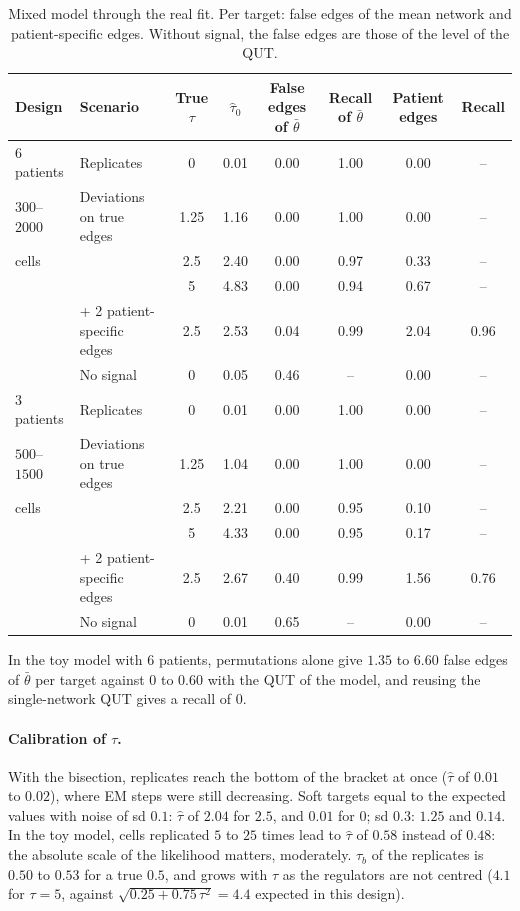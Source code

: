 \documentclass[a4paper, 11pt]{article}
\newcommand{\tb}{\bar\theta}
\theoremstyle{plain}
\theoremstyle{remark}
\begin{document}
\begin{table}[h]
\centering\small
\begin{tabular}{llcccccc}
\toprule
Design & Scenario & True $\tau$ & $\hat\tau_0$ & False edges of $\tb$ & Recall of $\tb$ & Patient edges & Recall \\
\midrule
$6$ patients & Replicates & 0 & 0.01 & 0.00 & 1.00 & 0.00 & -- \\
$300$--$2000$ & Deviations on true edges & 1.25 & 1.16 & 0.00 & 1.00 & 0.00 & -- \\
cells & & 2.5 & 2.40 & 0.00 & 0.97 & 0.33 & -- \\
 & & 5 & 4.83 & 0.00 & 0.94 & 0.67 & -- \\
 & + 2 patient-specific edges & 2.5 & 2.53 & 0.04 & 0.99 & 2.04 & 0.96 \\
 & No signal & 0 & 0.05 & 0.46 & -- & 0.00 & -- \\
\midrule
$3$ patients & Replicates & 0 & 0.01 & 0.00 & 1.00 & 0.00 & -- \\
$500$--$1500$ & Deviations on true edges & 1.25 & 1.04 & 0.00 & 1.00 & 0.00 & -- \\
cells & & 2.5 & 2.21 & 0.00 & 0.95 & 0.10 & -- \\
 & & 5 & 4.33 & 0.00 & 0.95 & 0.17 & -- \\
 & + 2 patient-specific edges & 2.5 & 2.67 & 0.40 & 0.99 & 1.56 & 0.76 \\
 & No signal & 0 & 0.01 & 0.65 & -- & 0.00 & -- \\
\bottomrule
\end{tabular}
\caption{Mixed model through the real fit. Per target: false edges of the mean network and patient-specific edges. Without signal, the false edges are those of the level of the QUT.}\label{tab:qut}
\end{table}

In the toy model with $6$ patients, permutations alone give $1.35$ to $6.60$ false edges of $\tb$ per target against $0$ to $0.60$ with the QUT of the model, and reusing the single-network QUT gives a recall of $0$.

\paragraph{Calibration of $\tau$.} With the bisection, replicates reach the bottom of the bracket at once ($\hat\tau$ of $0.01$ to $0.02$), where EM steps were still decreasing. Soft targets equal to the expected values with noise of sd $0.1$: $\hat\tau$ of $2.04$ for $2.5$, and $0.01$ for $0$; sd $0.3$: $1.25$ and $0.14$. In the toy model, cells replicated $5$ to $25$ times lead to $\hat\tau$ of $0.58$ instead of $0.48$: the absolute scale of the likelihood matters, moderately. $\tau_b$ of the replicates is $0.50$ to $0.53$ for a true $0.5$, and grows with $\tau$ as the regulators are not centred ($4.1$ for $\tau = 5$, against $\sqrt{0.25 + 0.75\,\tau^2} = 4.4$ expected in this design).
\end{document}
